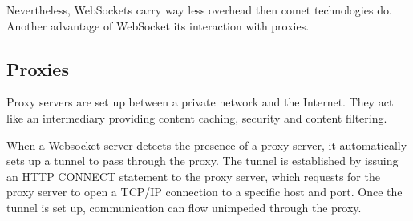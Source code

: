 Nevertheless, WebSockets carry way less overhead then comet technologies do.
Another advantage of WebSocket its interaction with proxies.

\subsection{Proxies}

Proxy servers are set up between a private network and the Internet. They act
like an intermediary providing content caching, security and content
filtering.

When a Websocket server detects the presence of a proxy server, it
automatically sets up a tunnel to pass through the proxy. The tunnel is
established by issuing an HTTP CONNECT statement to the proxy server, which
requests for the proxy server to open a TCP/IP connection to a specific host
and port. Once the tunnel is set up, communication can flow unimpeded through
the proxy.



